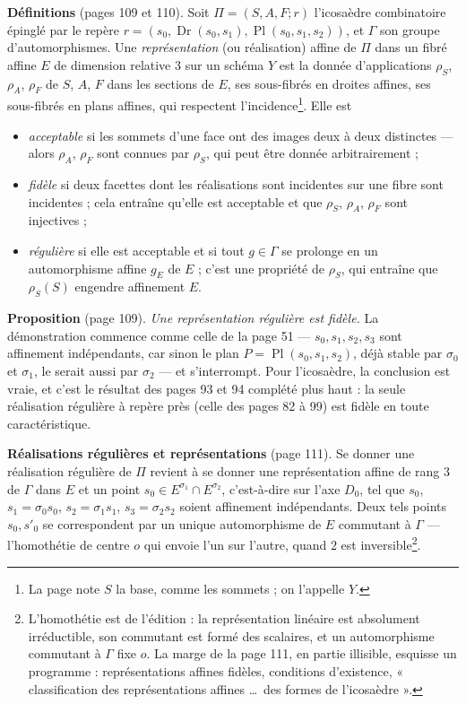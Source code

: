 \documentclass[11pt,a4paper]{article}
\begin{document}
\textbf{Définitions} (pages 109 et 110). Soit $\Pi = (S, A, F; r)$ l'icosaèdre
combinatoire épinglé par le repère $r = (s_0, \operatorname{Dr}(s_0, s_1),
\operatorname{Pl}(s_0, s_1, s_2))$, et $\Gamma$ son groupe d'automorphismes. Une
\emph{représentation} (ou réalisation) affine de $\Pi$ dans un fibré affine $E$
de dimension relative $3$ sur un schéma $Y$ est la donnée d'applications
$\rho_S$, $\rho_A$, $\rho_F$ de $S$, $A$, $F$ dans les sections de $E$, ses
sous-fibrés en droites affines, ses sous-fibrés en plans affines, qui
respectent l'incidence\footnote{La page note $S$ la base, comme les
sommets ; on l'appelle $Y$.}. Elle est
\begin{itemize}
  \item \emph{acceptable} si les sommets d'une face ont des images deux à deux
    distinctes --- alors $\rho_A$, $\rho_F$ sont connues par $\rho_S$, qui
    peut être donnée arbitrairement ;
  \item \emph{fidèle} si deux facettes dont les réalisations sont incidentes
    sur une fibre sont incidentes ; cela entraîne qu'elle est acceptable et que
    $\rho_S$, $\rho_A$, $\rho_F$ sont injectives ;
  \item \emph{régulière} si elle est acceptable et si tout $g \in \Gamma$ se
    prolonge en un automorphisme affine $g_E$ de $E$ ; c'est une propriété de
    $\rho_S$, qui entraîne que $\rho_S(S)$ engendre affinement $E$.
\end{itemize}

\textbf{Proposition} (page 109). \emph{Une représentation régulière est fidèle.}
La démonstration commence comme celle de la page 51 --- $s_0, s_1, s_2, s_3$ sont
affinement indépendants, car sinon le plan $P = \operatorname{Pl}(s_0, s_1, s_2)$,
déjà stable par $\sigma_0$ et $\sigma_1$, le serait aussi par $\sigma_2$ --- et
s'interrompt. Pour l'icosaèdre, la conclusion est vraie, et c'est le résultat
des pages 93 et 94 complété plus haut : la seule réalisation régulière à repère
près (celle des pages 82 à 99) est fidèle en toute caractéristique.

\textbf{Réalisations régulières et représentations} (page 111). Se donner une
réalisation régulière de $\Pi$ revient à se donner une représentation affine de
rang $3$ de $\Gamma$ dans $E$ et un point $s_0 \in E^{\sigma_1} \cap
E^{\sigma_2}$, c'est-à-dire sur l'axe $D_0$, tel que $s_0$, $s_1 = \sigma_0 s_0$,
$s_2 = \sigma_1 s_1$, $s_3 = \sigma_2 s_2$ soient affinement indépendants. Deux
tels points $s_0, s'_0$ se correspondent par un unique automorphisme de $E$
commutant à $\Gamma$ --- l'homothétie de centre $o$ qui envoie l'un sur
l'autre, quand $2$ est inversible\footnote{L'homothétie est de l'édition : la
représentation linéaire est absolument irréductible, son commutant est formé
des scalaires, et un automorphisme commutant à $\Gamma$ fixe $o$. La marge de
la page 111, en partie illisible, esquisse un programme : représentations
affines fidèles, conditions d'existence, « classification des représentations
affines \ldots\ des formes de l'icosaèdre ».}.
\end{document}
